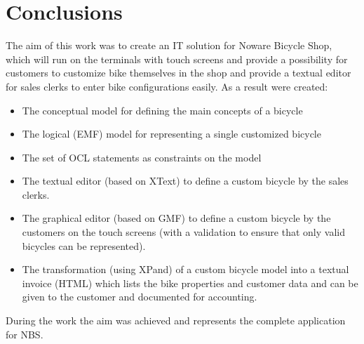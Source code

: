 \section{Conclusions}
\label{sec.conclusions}

\noindent  The aim of this work was to create an IT solution for 
Noware Bicycle Shop, which will run on the terminals with touch screens 
and provide a possibility for customers to customize bike themselves 
in the shop and provide a textual editor for sales clerks to enter bike
configurations easily. As a result were created:
\begin{itemize} 
  \item The conceptual model for defining the main concepts of a bicycle
  \item The logical (EMF) model for representing a single customized bicycle
  \item The set of OCL statements as constraints on the model
  \item The textual editor (based on XText) to define a custom bicycle by the
  sales clerks.
  \item The graphical editor (based on GMF) to define a custom bicycle by the
  customers on the touch screens (with a validation to ensure that only valid 
  bicycles can be represented).
  \item The transformation (using XPand) of a custom bicycle model into a 
  textual invoice (HTML) which lists the bike properties and customer data 
  and can be given to the customer and documented for accounting.
\end{itemize}
During the work the aim was achieved and represents the complete application for NBS.
